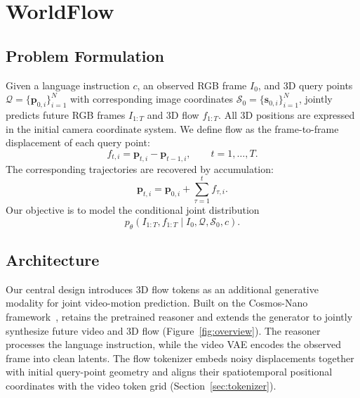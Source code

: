 \section{WorldFlow}
\label{sec:method}

\subsection{Problem Formulation}
\label{sec:problem}

Given a language instruction $c$, an observed RGB frame $I_0$,
and 3D query points
$\mathcal{Q}=\{\mathbf{p}_{0,i}\}_{i=1}^{N}$
with corresponding image coordinates
$\mathcal{S}_0=\{\mathbf{s}_{0,i}\}_{i=1}^{N}$,
\method{} jointly predicts future RGB frames $I_{1:T}$
and 3D flow $f_{1:T}$.
All 3D positions are expressed in the initial camera
coordinate system.
We define flow as the frame-to-frame displacement
of each query point:
\begin{equation}
f_{t,i}
=
\mathbf{p}_{t,i}-\mathbf{p}_{t-1,i},
\qquad t=1,\ldots,T.
\label{eq:flow-definition}
\end{equation}
The corresponding trajectories are recovered by accumulation:
\begin{equation}
\mathbf{p}_{t,i}
=
\mathbf{p}_{0,i}+\sum_{\tau=1}^{t}f_{\tau,i}.
\label{eq:trajectory-reconstruction}
\end{equation}
Our objective is to model the conditional joint distribution
\begin{equation}
p_\theta\left(
I_{1:T},f_{1:T}
\mid I_0,\mathcal{Q},\mathcal{S}_0,c
\right).
\label{eq:joint-distribution}
\end{equation}

\subsection{Architecture}
\label{sec:architecture}

Our central design introduces 3D flow tokens as an additional
generative modality for joint video-motion prediction.
Built on the Cosmos-Nano framework~\citep{nvidia2026cosmos3}, \method{} retains
the pretrained reasoner and extends the generator to
jointly synthesize future video and 3D flow
(Figure~\ref{fig:overview}).
The reasoner processes the language instruction, while
the video VAE encodes the observed frame into clean latents.
The flow tokenizer embeds noisy displacements together
with initial query-point geometry and aligns their
spatiotemporal positional coordinates with the video
token grid (Section~\ref{sec:tokenizer}).

